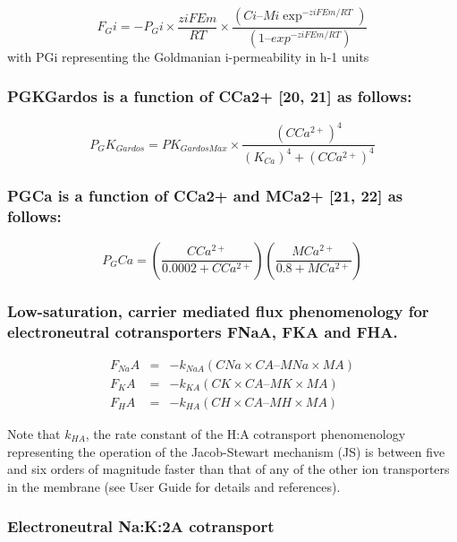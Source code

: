 \documentclass[a4paper]{article}
\newcommand{\med}[1]{M#1}
\newcommand{\cell}[1]{C#1}
\newcommand{\MA}{\med{A}}
\newcommand{\MNa}{\med{Na}}
\newcommand{\MK}{\med{K}}
\newcommand{\MCatp}{\med{Ca^{2+}}}
\newcommand{\MH}{\med{H}}
\newcommand{\KCa}{K_{Ca}}
\newcommand{\CNa}{\cell{Na}}
\newcommand{\CK}{\cell{K}}
\newcommand{\CH}{\cell{H}}
\newcommand{\CCatp}{\cell{Ca^{2+}}}
\newcommand{\CA}{\cell{A}}
\newcommand{\F}[2]{F_{#1}#2}
\newcommand{\kk}[2]{k_{#1}#2}
\begin{document}
\setcounter{equation}{12}
\renewcommand{\theequation}{\arabic{equation}}
\begin{equation}
\F{G}{i} = -P_{G}i\times\frac{ziFEm}{RT}\times\frac{(Ci – Mi\exp^{-ziFEm/RT})}{(1 – exp^{-ziFEm/RT})}
\end{equation}
with PGi representing the Goldmanian i-permeability in h-1 units

\subsubsection{PGKGardos is a function of CCa2+ [20, 21] as follows:}
\begin{equation}
P_{G}K_{Gardos} = PK_{GardosMax}\times\frac{(\CCatp)^4}{(\KCa)^4 + (\CCatp)^4}
\end{equation}

\subsubsection{PGCa is a function of CCa2+ and MCa2+ [21, 22] as follows:}
\begin{equation}
P_{G}Ca = \left(\frac{\CCatp}{0.0002 + \CCatp}\right)\left(\frac{\MCatp}{0.8 + \MCatp}\right)
\end{equation}

\subsubsection{Low-saturation, carrier mediated flux phenomenology for electroneutral cotransporters FNaA, FKA and FHA.}

\setcounter{equation}{0}
\renewcommand{\theequation}{16.\alph{equation}}
\begin{eqnarray}
\F{Na}{A} &=& - \kk{NaA}{}(\CNa\times\CA – \MNa\times\MA) \\
\F{K}{A} &=& - \kk{KA}{}(\CK\times\CA – \MK\times\MA) \\
\F{H}{A} &=& - \kk{HA}{}(\CH\times\CA – \MH\times\MA) 
\end{eqnarray}

Note that $\kk{HA}{}$, the rate constant of the H:A cotransport phenomenology representing the operation of the Jacob-Stewart mechanism (JS) is between five and six orders of magnitude faster than that of any of the other ion transporters in the membrane (see User Guide for details and references).  

\setcounter{equation}{0}
\renewcommand{\theequation}{17.\alph{equation}}

\subsubsection{Electroneutral Na:K:2A cotransport}
\end{document}
